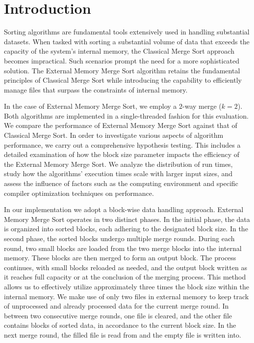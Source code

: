 \documentclass[twocolumn]{article}
\begin{document}
\section{Introduction}

Sorting algorithms are fundamental tools extensively used in handling substantial datasets.
When tasked with sorting a substantial volume of data that exceeds the capacity of the system's internal memory, the Classical Merge Sort approach becomes impractical.
Such scenarios prompt the need for a more sophisticated solution. The External Memory Merge Sort algorithm retains the fundamental principles of Classical Merge Sort while introducing
the capability to efficiently manage files that surpass the constraints of internal memory.

In the case of External Memory Merge Sort, we employ a \(2\)-way merge (\( k = 2 \)). Both algorithms are implemented in a single-threaded fashion for this evaluation.
We compare the performance of External Memory Merge Sort against that of Classical Merge Sort.
In order to investigate various aspects of algorithm performance, we carry out a comprehensive hypothesis testing.
This includes a detailed examination of how the block size parameter impacts the efficiency of the External Memory Merge Sort.
We analyze the distribution of run times, study how the algorithms' execution times scale with larger input sizes, and assess the influence of factors such as the computing
environment and specific compiler optimization techniques on performance.

In our implementation we adopt a block-wise data handling approach. External Memory Merge Sort operates in two distinct phases.
In the initial phase, the data is organized into sorted blocks, each adhering to the designated block size.
In the second phase, the sorted blocks undergo multiple merge rounds. During each round, two small blocks are loaded from the two merge blocks into the internal memory.
These blocks are then merged to form an output block. The process continues, with small blocks reloaded as needed, and the output block written as it reaches full capacity or
at the conclusion of the merging process. This method allows us to effectively utilize approximately three times the block size within the internal memory.
We make use of only two files in external memory to keep track of unprocessed and already processed data for the current merge round.
In between two consecutive merge rounds, one file is cleared, and the other file contains blocks of sorted data, in accordance to the current block size.
In the next merge round, the filled file is read from and the empty file is written into.
\end{document}
